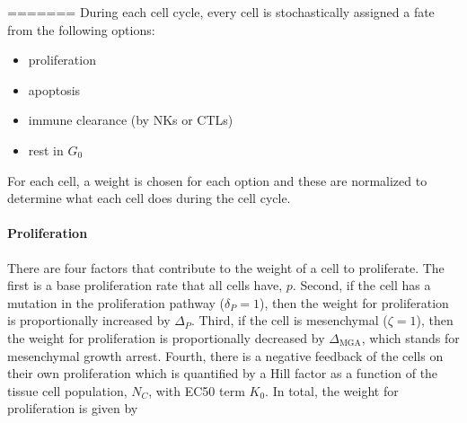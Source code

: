 \documentclass[11pt]{article}
\begin{document}
%
%



=======
During each cell cycle, every cell is stochastically assigned a fate from the following options:
\begin{itemize}
\item proliferation
\item apoptosis
\item immune clearance (by NKs or CTLs)
\item rest in $G_0$
\end{itemize}
For each cell, a weight is chosen for each option and these are normalized to determine what each cell does during the cell cycle.

\paragraph{Proliferation}
There are four factors that contribute to the weight of a cell to proliferate.
The first is a base proliferation rate that all cells have, $p$.
Second, if the cell has a mutation in the proliferation pathway ($\delta_P=1$), then the weight for proliferation is proportionally increased by $\Delta_P$.
Third, if the cell is mesenchymal ($\zeta=1$), then the weight for proliferation is proportionally decreased by $\Delta_{\text{MGA}}$, which stands for mesenchymal growth arrest.
Fourth, there is a negative feedback of the cells on their own proliferation which is quantified by a Hill factor as a function of the tissue cell population, $N_C$, with EC50 term $K_0$.
In total, the weight for proliferation is given by
\end{document}
